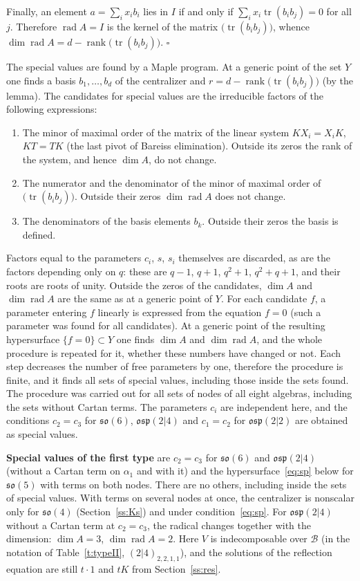 \documentclass[12pt,a4paper]{article}
\newcommand{\so}{\mathfrak{so}}
\newcommand{\osp}{\mathfrak{osp}}
\begin{document}
Finally, an element $a=\sum_ix_ib_i$ lies in $I$ if and only if $\sum_ix_i\operatorname{tr}(b_ib_j)=0$
for all $j$. Therefore $\operatorname{rad}A=I$ is the kernel of the matrix $\bigl(\operatorname{tr}(b_ib_j)\bigr)$, whence
$\dim\operatorname{rad}A=d-\operatorname{rank}\bigl(\operatorname{tr}(b_ib_j)\bigr)$. $\square$

The special values are found by a Maple program. At a generic point
of the set $Y$ one finds a basis $b_1,\dots,b_d$ of the centralizer and $r=d-\operatorname{rank}\bigl(\operatorname{tr}(b_ib_j)\bigr)$
(by the lemma). The candidates for special values are the irreducible factors of the following expressions:
\begin{enumerate}
\item The minor of maximal order of the matrix of the linear system $KX_i=X_iK$, $KT=TK$ (the last pivot of Bareiss elimination). Outside its zeros the rank of the system, and hence $\dim A$, do not change.
\item The numerator and the denominator of the minor of maximal order of $\bigl(\operatorname{tr}(b_ib_j)\bigr)$. Outside their zeros $\dim\operatorname{rad}A$ does not change.
\item The denominators of the basis elements $b_k$. Outside their zeros the basis is defined.
\end{enumerate}
Factors equal to the parameters $c_i$, $s$, $s_i$ themselves are discarded, as are the factors depending only on $q$:
these are $q-1$, $q+1$, $q^2+1$, $q^2+q+1$, and their roots are roots of unity. Outside the zeros of the candidates, $\dim A$ and
$\dim\operatorname{rad}A$ are the same as at a generic point of $Y$. For each candidate $f$, a parameter entering $f$
linearly is expressed from the equation $f=0$ (such a parameter was found for all candidates). At a generic point of the resulting
hypersurface $\{f=0\}\subset Y$ one finds $\dim A$ and $\dim\operatorname{rad}A$, and the whole procedure
is repeated for it, whether these numbers have changed or not. Each step decreases the number of free parameters by one, therefore
the procedure is finite, and it finds all sets of special values, including those inside the sets found.
The procedure was carried out for all sets of nodes of all eight algebras, including the sets without Cartan terms. The parameters
$c_i$ are independent here, and the conditions $c_2=c_3$ for $\so(6)$, $\osp(2|4)$ and $c_1=c_2$ for $\osp(2|2)$ are obtained
as special values.

\textbf{Special values of the first type} are $c_2=c_3$ for $\so(6)$ and $\osp(2|4)$ (without a Cartan term on $\alpha_1$ and with it)
and the hypersurface~\eqref{eq:sp} below for $\so(5)$ with terms on both nodes. There are no others, including inside the sets
of special values. With terms on several nodes at once, the centralizer is nonscalar only for $\so(4)$
(Section~\ref{ss:Ks}) and under condition~\eqref{eq:sp}. For $\osp(2|4)$ without a Cartan term at $c_2=c_3$, the
radical changes together with the dimension: $\dim A=3$, $\dim\operatorname{rad}A=2$. Here $V$ is indecomposable over $\mathcal B$ (in the notation of Table~\ref{t:typeII},
$(2|4)_{2,2,1,1}$), and the solutions of the reflection equation are still $t\cdot1$ and $tK$ from Section~\ref{ss:res}.
\end{document}
